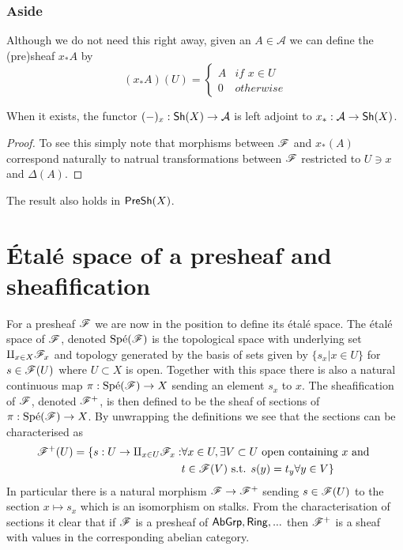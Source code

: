 \documentclass{memoir}
\begin{document}
\subsubsection{Aside}
Although we do not need this right away, given an $A\in \mathcal A$ we can define the (pre)sheaf $x_*A$ by 
\begin{equation}
    (x_*A)(U) = \begin{cases}
        A & \textit{if } x\in U \\
        0 & otherwise
    \end{cases}
\end{equation}
\begin{proposition}
    When it exists, the functor $(-)_x:{\normalfont\mathsf{Sh}}(X)\to \mathcal A$ is left adjoint to $x_*:\mathcal A\to {\normalfont\mathsf{Sh}}(X)$.
\end{proposition}
\begin{proof}
    To see this simply note that morphisms between $\mathscr{F}$ and $x_*(A)$ correspond naturally to natrual transformations between $\mathscr{F}$ restricted to $U\ni x$ and $\Delta(A)$.
\end{proof}
\begin{remark}
    The result also holds in ${\normalfont\mathsf{PreSh}}(X)$.
\end{remark}
\section{\'Etal\'e space of a presheaf and sheafification}
For a presheaf $\mathscr{F}$ we are now in the position to define its \'etal\'e space.
The \'etal\'e space of $\mathscr{F}$, denoted $\text{Sp\'e}(\mathscr{F})$ is the topological space with underlying set $\amalg_{x\in X}\mathscr{F}_x$ and topology generated by the basis of sets given by $\{s_x|x\in U\}$ for $s\in \mathscr{F}(U)$ where $U\subset X$ is open.
Together with this space there is also a natural continuous map $\pi:\text{Sp\'e}(\mathscr{F})\to X$ sending an element $s_x$ to $x$.
The sheafification of $\mathscr{F}$, denoted $\mathscr{F}^+$, is then defined to be the sheaf of sections of $\pi:\text{Sp\'e}(\mathscr{F})\to X$.
By unwrapping the definitions we see that the sections can be characterised as
\begin{align}
    \mathscr{F}^+(U) = \{s:U\to\amalg_{x\in U}\mathscr{F}_x : & \forall x\in U, \exists V\subset U \text{ open containing $x$ and } \nonumber \\
                                                            & t\in\mathscr{F}(V) \text{ s.t. }  s(y) = t_y \forall y\in V\}
\end{align}
In particular there is a natural morphism $\mathscr{F} \to \mathscr{F}^+$ sending $s\in \mathscr{F}(U)$ to the section $x\mapsto s_x$ which is an isomorphism on stalks.
From the characterisation of sections it clear that if $\mathscr{F}$ is a presheaf of ${\normalfont\mathsf{AbGrp}},{\normalfont\mathsf{Ring}},...$ then $\mathscr{F}^+$ is a sheaf with values in the corresponding abelian category.
\end{document}
